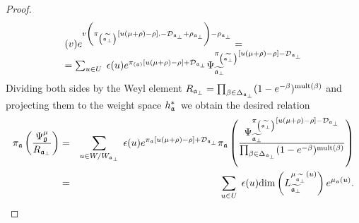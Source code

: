 \documentclass[12pt]{iopart}
\theoremstyle{definition}
\begin{document}
\begin{proof}
\begin{equation*}
\begin{array}{l}
(v)e^{v\left( \pi _{\left( \widetilde{\frak{a}_{\perp }}\right) }\left[
u(\mu +\rho )-\rho \right] .-\mathcal{D}_{\frak{a}_{\perp }}+\rho _{\frak{a}%
_{\perp }}\right) -\rho _{\frak{a}_{\perp }}}= \\
=\sum_{u\in U}\;\epsilon (u)e^{\pi _{\left( \frak{a}\right) }\left[ u(\mu
+\rho )-\rho \right] +\mathcal{D}_{\frak{a}_{\perp }}}\Psi _{\widetilde{%
\frak{a}_{\perp }}}^{\pi _{\left( \widetilde{\frak{a}_{\perp }}\right) }%
\left[ u(\mu +\rho )-\rho \right] -\mathcal{D}_{\frak{a}_{\perp }}}
\end{array}
\end{equation*}
Dividing both sides by the Weyl element $R_{\frak{a}_{\perp }}=\prod_{\beta
\in \Delta _{\frak{a}_{\perp }}}(1-e^{-\beta })^{\mathrm{mult}(\beta )}$ and
projecting them to the weight space $h_{\frak{a}}^{\ast }$\ we obtain the
desired relation
\begin{eqnarray*}
\pi _{\frak{a}}\left( \frac{\Psi _{\frak{g}}^{\mu }}{R_{\frak{a}_{\perp }}}%
\right)  &=&\sum_{u\in W/W_{\frak{a}_{\perp }}}\;\epsilon (u)e^{\pi _{\frak{a%
}}\left[ u(\mu +\rho )-\rho \right] +\mathcal{D}_{\frak{a}_{\perp }}}\pi _{%
\frak{a}}\left( \frac{\Psi _{\widetilde{\frak{a}_{\perp }}}^{\pi _{\left(
\widetilde{\frak{a}_{\perp }}\right) }\left[ u(\mu +\rho )-\rho \right] -%
\mathcal{D}_{\frak{a}_{\perp }}}}{\prod_{\beta \in \Delta _{\frak{a}_{\perp
}}}(1-e^{-\beta })^{\mathrm{mult}(\beta )}}\right)  \\
&=&\sum_{u\in U}\;\epsilon (u)\mathrm{\dim }\left( L_{\widetilde{\frak{a}%
_{\perp }}}^{\mu _{\widetilde{\frak{a}_{\perp }}}\left( u\right) }\right)
e^{\mu _{\frak{a}}\left( u\right) }.
\end{eqnarray*}
\end{proof}
\end{document}

